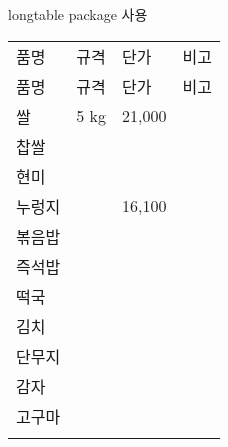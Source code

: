 				longtable package 사용


				\begin{longtabu} to 1.0\textwidth { X[r,m, 1.2] X[l,m, 1.6] X[r, 0.8] X[c,m, 1.8] }
				\tabucline[0.2ex]{-}		
				품명				&규격		&단가	&비고\\
				\tabucline[0.1ex]{-}		
				\endfirsthead
				\tabucline[0.2ex]{-}		
				품명				&규격		&단가	&비고\\
				\tabucline[0.1ex]{-}		
				\endhead
				\tabucline[0.1ex]{-}		
				\endfoot
				\tabucline[0.1ex]{-}		
				\endlastfoot
				쌀				& 5 kg		& 21,000	&\\
				찹쌀				&			&		&\\
				현미				&			&		&\\
				누렁지			&			&16,100	&\\
				볶음밥 			&			&		&\\
				즉석밥 			&			&		&\\
				떡국	 			&			&		&\\
				\tabucline[0.01ex]{-}		
				김치				&				&		&\\
				단무지			&				&		&\\
				\tabucline[0.01ex]{-}		
				감자				&				&		&\\
				고구마			&				&		&\\
				\tabucline[0.1ex]{-}		
				\end{longtabu} 


 


